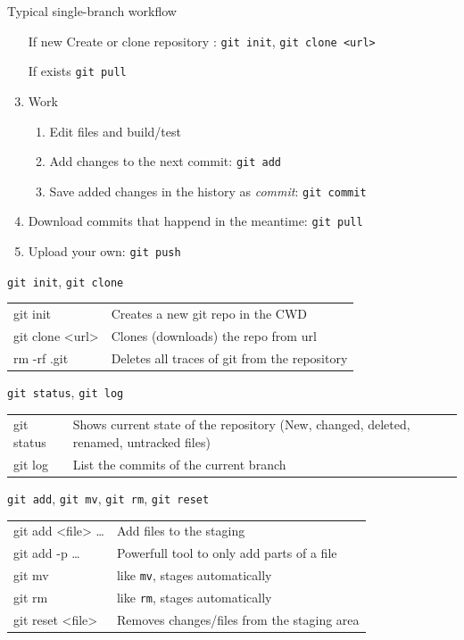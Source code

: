 \begin{frame}{Typical single-branch workflow}
  \begin{enumerate}
    \item[If new] Create or clone repository : \texttt{git init}, \texttt{git clone <url>}
    \item[If exists] \texttt{git pull}
    \item Work
      \begin{enumerate}
        \item Edit files and build/test
        \item Add changes to the next commit: \texttt{git add}
        \item Save added changes in the history as \emph{commit}: \texttt{git commit}
      \end{enumerate}
    \item Download commits that happend in the meantime: \texttt{git pull}
    \item Upload your own: \texttt{git push}
  \end{enumerate}
\end{frame}

\begin{frame}{\texttt{git init}, \texttt{git clone}}
  \begin{tabu}{>{\ttfamily}l X[,L]}
    git init          & Creates a new git repo in the CWD \\
    git clone <url>   & Clones (downloads) the repo from url \\
    rm -rf .git       & Deletes all traces of git from the repository
  \end{tabu}
\end{frame}

\begin{frame}{\texttt{git status}, \texttt{git log}}
  \begin{tabu}{>{\ttfamily}l X[,L]}
    git status & Shows current state of the repository (New, changed, deleted, renamed, untracked files) \\
    git log    & List the commits of the current branch
  \end{tabu}
\end{frame}

\begin{frame}{\texttt{git add}, \texttt{git mv}, \texttt{git rm}, \texttt{git reset}}
  \begin{tabu}{>{\ttfamily}l X[,L]}
    git add <file> … & Add files to the staging \\
    git add -p …     & Powerfull tool to only add parts of a file \\
    git mv           & like \texttt{mv}, stages automatically \\
    git rm           & like \texttt{rm}, stages automatically \\
    git reset <file> & Removes changes/files from the staging area
  \end{tabu}
\end{frame}

